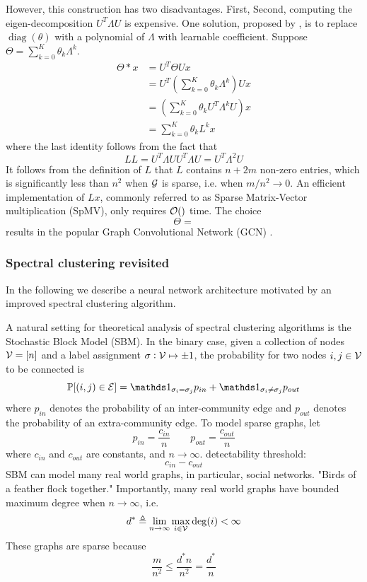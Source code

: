 \documentclass{article}
\DeclareMathOperator{\deg}{deg}
\DeclareMathOperator{\diag}{diag}
\newcommand{\ind}{{\mathds 1}}
\begin{document}
However, this construction has two disadvantages.
First,
Second, computing the eigen-decomposition $U^T \Lambda U$ is expensive.
One solution, proposed by \cite{defferrard2016convolutional}, is to replace $\diag (\theta)$ with a polynomial of $\Lambda$ with learnable coefficient.
Suppose $\Theta = \sum_{k = 0}^K \theta_k \Lambda^k$.
\begin{align*}
\Theta * x
& = U^T \Theta U x \\
& = U^T \left(\sum_{k = 0}^K \theta_k \Lambda^k \right) U x \\
& = \left(\sum_{k = 0}^K \theta_k U^T \Lambda^k U \right) x \\
& = \sum_{k = 0}^K \theta_k L^k x
\end{align*}
where the last identity follows from the fact that
\[
L L
= U^T \Lambda U U^T \Lambda U
= U^T \Lambda^2 U
\]
It follows from the definition of $L$ that $L$ contains $n + 2 m$ non-zero entries, which is significantly less than $n^2$ when ${\mathcal G}$ is sparse, i.e. when $m / n^2 \rightarrow 0$.
An efficient implementation of $L x$, commonly referred to as Sparse Matrix-Vector multiplication (SpMV), only requires ${\mathcal O} ()$ time.
The choice
\[
\Theta = 
\]
results in the popular Graph Convolutional Network (GCN) \cite{kipf2016semi}.

\subsubsection{Spectral clustering revisited}

In the following we describe a neural network architecture motivated by an improved spectral clustering algorithm.

A natural setting for theoretical analysis of spectral clustering algorithms is the Stochastic Block Model (SBM).
In the binary case, given a collection of nodes ${\mathcal V} = [n]$ and a label assignment $\sigma: {\mathcal V} \mapsto {\pm 1}$, the probability for two nodes $i, j \in {\mathcal V}$ to be connected is
\[
\bbp [(i, j) \in \cale]
= \ind_{\sigma_i = \sigma_j} p_{in} + \ind_{\sigma_i \ne \sigma_j} p_{out}
\]
where $p_{in}$ denotes the probability of an inter-community edge and $p_{out}$ denotes the probability of an extra-community edge.
To model sparse graphs, let
\[
p_{in} = \frac{c_{in}}n \qquad
p_{out} = \frac{c_{out}}n
\]
where $c_{in}$ and $c_{out}$ are constants, and $n \rightarrow \infty$.
detectability threshold:
\[
c_{in} - c_{out}
\]
SBM can model many real world graphs, in particular, social networks.
"Birds of a feather flock together."
Importantly, many real world graphs have bounded maximum degree when $n \rightarrow \infty$, i.e.
\[
d^* \triangleq \lim_{n \rightarrow \infty} \max_{i \in \calv} \deg (i) < \infty
\]
These graphs are sparse because
\[
\frac{m}{n^2}
\leq \frac{d^* n}{n^2}
= \frac{d^*}n
\]
\end{document}
